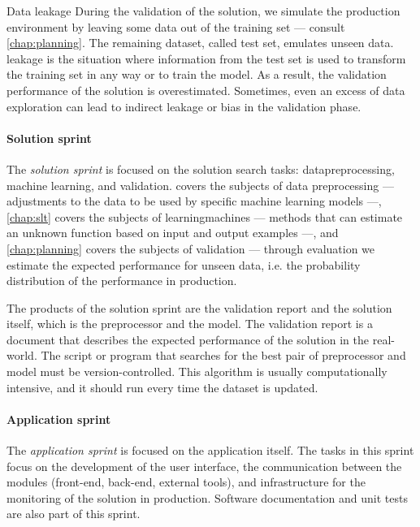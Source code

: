 \begin{defbox}{Data leakage}{}
  During the validation of the solution, we simulate the production environment by leaving
  some data out of the training set --- consult \cref{chap:planning}.  The remaining
  dataset, called test set, emulates unseen data.  \Gls{leakage} is the situation where
  information from the test set is used to transform the training set in any way or to
  train the model.  As a result, the validation performance of the solution is
  overestimated.  Sometimes, even an excess of data exploration can lead to indirect
  \gls{leakage} or bias in the validation phase.
\end{defbox}

\paragraph{Solution sprint}
The \emph{solution sprint} is focused on the solution search tasks: \gls{datapreprocessing}, machine
learning, and validation.   covers the subjects of data
preprocessing ---
adjustments to the data to be used by specific machine learning models ---, \cref{chap:slt}
covers the subjects of \glspl{learningmachine} --- methods that can estimate an unknown function
based on input and output examples  ---, and \cref{chap:planning} covers
the subjects of validation --- through evaluation we estimate the expected performance for unseen
data, i.e. the probability distribution of the performance in production.

The products of the solution sprint are the validation report and the solution itself,
which is the \gls{preprocessor} and the model.  The validation report is a document that
describes the expected performance of the solution in the real-world.  The script or
program that searches for the best pair of \gls{preprocessor} and model must be
version-controlled.  This algorithm is usually computationally intensive, and it should
run every time the dataset is updated.

\paragraph{Application sprint}
The \emph{application sprint} is focused on the application itself.  The tasks in this
sprint focus on the development of the user interface, the communication between the
modules (front-end, back-end, external tools), and infrastructure for the monitoring of
the solution in production.  Software documentation and unit tests are also part of this
sprint.

